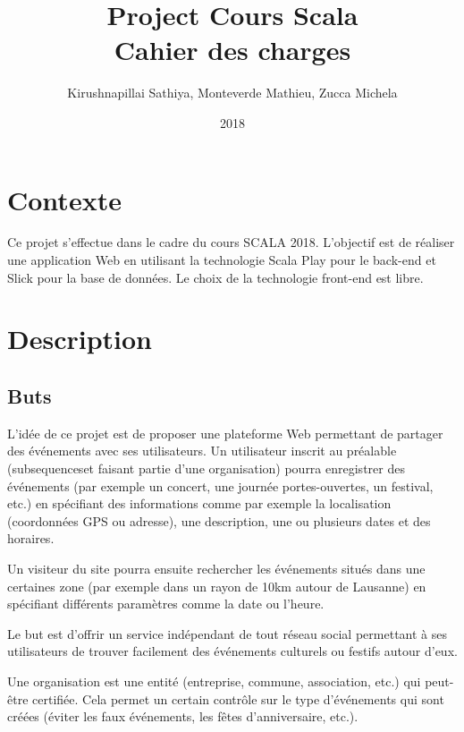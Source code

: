\documentclass[11pt, a4paper, french, twoside]{article}
\title{Project Cours Scala \\ Cahier des charges}
\author{Kirushnapillai Sathiya, Monteverde Mathieu, Zucca Michela}
\date{2018}
\begin{document}
	\graphicspath{ {images/} }
	
	\newcommand{\HRule}{\rule{\linewidth}{0.5mm}}
	
	
	
	\setcounter{page}{1}
	\newpage
	
	\setlength{\parskip}{0.2cm}
	
	\section{Contexte}
	\label{sec:contexte}
		Ce projet s'effectue dans le cadre du cours SCALA 2018. L'objectif est de réaliser une application Web en utilisant la technologie Scala Play pour le back-end et Slick pour la base de données. Le choix de la technologie front-end est libre.
		
	\section{Description}
	\label{sec:description}
	
		\subsection{Buts}
		\label{subsec:buts}
		L'idée de ce projet est de proposer une plateforme Web permettant de partager des événements avec ses utilisateurs. Un utilisateur inscrit au préalable (subsequenceset faisant partie d'une organisation) pourra enregistrer des événements (par exemple un concert, une journée portes-ouvertes, un festival, etc.) en spécifiant des informations comme par exemple la localisation (coordonnées GPS ou adresse), une description, une ou plusieurs dates et des horaires.
		
		Un visiteur du site pourra ensuite rechercher les événements situés dans une certaines zone (par exemple dans un rayon de 10km autour de Lausanne) en spécifiant différents paramètres comme la date ou l'heure. 
		
		Le but est d'offrir un service indépendant de tout réseau social permettant à ses utilisateurs de trouver facilement des événements culturels ou festifs autour d'eux. 
		
		Une organisation est une entité (entreprise, commune, association, etc.) qui peut-être certifiée. Cela permet un certain contrôle sur le type d'événements qui sont créées (éviter les faux événements, les fêtes d'anniversaire, etc.).
	
\end{document}

